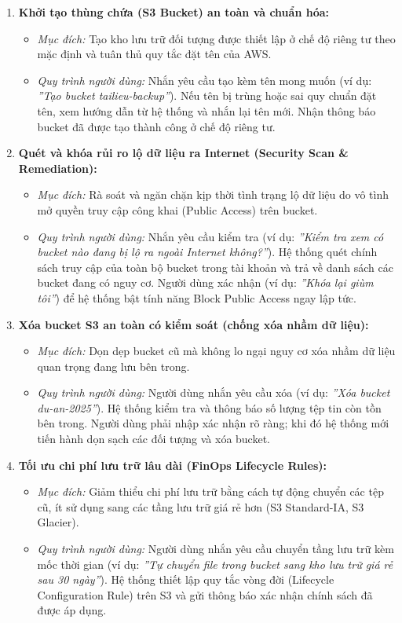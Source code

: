 \documentclass[a4paper,12pt]{article}
\begin{document}
\begin{enumerate}
  \item \textbf{Khởi tạo thùng chứa (S3 Bucket) an toàn và chuẩn hóa:}
  \begin{itemize}
    \item \textit{Mục đích:} Tạo kho lưu trữ đối tượng được thiết lập ở chế độ riêng tư theo mặc định và tuân thủ quy tắc đặt tên của AWS.
    \item \textit{Quy trình người dùng:} Nhắn yêu cầu tạo kèm tên mong muốn (ví dụ: \textit{''Tạo bucket tailieu-backup''}). Nếu tên bị trùng hoặc sai quy chuẩn đặt tên, xem hướng dẫn từ hệ thống và nhắn lại tên mới. Nhận thông báo bucket đã được tạo thành công ở chế độ riêng tư.
  \end{itemize}

  \item \textbf{Quét và khóa rủi ro lộ dữ liệu ra Internet (Security Scan \& Remediation):}
  \begin{itemize}
    \item \textit{Mục đích:} Rà soát và ngăn chặn kịp thời tình trạng lộ dữ liệu do vô tình mở quyền truy cập công khai (Public Access) trên bucket.
    \item \textit{Quy trình người dùng:} Nhắn yêu cầu kiểm tra (ví dụ: \textit{''Kiểm tra xem có bucket nào đang bị lộ ra ngoài Internet không?''}). Hệ thống quét chính sách truy cập của toàn bộ bucket trong tài khoản và trả về danh sách các bucket đang có nguy cơ. Người dùng xác nhận (ví dụ: \textit{''Khóa lại giùm tôi''}) để hệ thống bật tính năng Block Public Access ngay lập tức.
  \end{itemize}

  \item \textbf{Xóa bucket S3 an toàn có kiểm soát (chống xóa nhầm dữ liệu):}
  \begin{itemize}
    \item \textit{Mục đích:} Dọn dẹp bucket cũ mà không lo ngại nguy cơ xóa nhầm dữ liệu quan trọng đang lưu bên trong.
    \item \textit{Quy trình người dùng:} Người dùng nhắn yêu cầu xóa (ví dụ: \textit{''Xóa bucket du-an-2025''}). Hệ thống kiểm tra và thông báo số lượng tệp tin còn tồn bên trong. Người dùng phải nhập xác nhận rõ ràng; khi đó hệ thống mới tiến hành dọn sạch các đối tượng và xóa bucket.
  \end{itemize}

  \item \textbf{Tối ưu chi phí lưu trữ lâu dài (FinOps Lifecycle Rules):}
  \begin{itemize}
    \item \textit{Mục đích:} Giảm thiểu chi phí lưu trữ bằng cách tự động chuyển các tệp cũ, ít sử dụng sang các tầng lưu trữ giá rẻ hơn (S3 Standard-IA, S3 Glacier).
    \item \textit{Quy trình người dùng:} Người dùng nhắn yêu cầu chuyển tầng lưu trữ kèm mốc thời gian (ví dụ: \textit{''Tự chuyển file trong bucket sang kho lưu trữ giá rẻ sau 30 ngày''}). Hệ thống thiết lập quy tắc vòng đời (Lifecycle Configuration Rule) trên S3 và gửi thông báo xác nhận chính sách đã được áp dụng.
  \end{itemize}


\end{enumerate}
\end{document}
